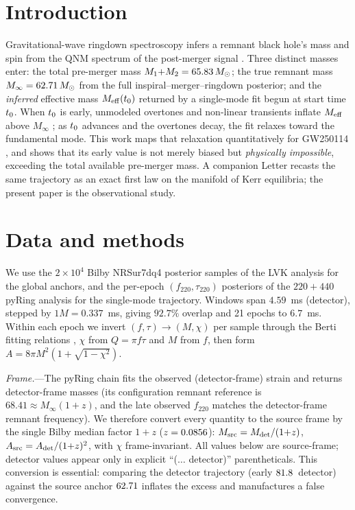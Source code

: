 \documentclass[aps,prd,twocolumn,superscriptaddress,nofootinbib,longbibliography]{revtex4-2}
\newcommand{\Meff}{M_{\rm eff}}\newcommand{\aeff}{\chi_{\rm eff}}
\begin{document}
\section{Introduction}
Gravitational-wave ringdown spectroscopy infers a remnant black hole's mass and
spin from the QNM spectrum of the post-merger signal
\cite{Berti2006,Giesler2019,Isi2019}. Three distinct masses enter: the total
pre-merger mass $M_1{+}M_2=65.83\,M_\odot$; the true remnant mass
$M_\infty=62.71\,M_\odot$ from the full inspiral--merger--ringdown posterior; and
the \emph{inferred} effective mass $\Meff(\tstart)$ returned by a single-mode
fit begun at start time $t_0$. When $t_0$ is early, unmodeled overtones
and non-linear transients inflate $\Meff$ above $M_\infty$
\cite{Giesler2019,Isi2019,Bhagwat2018}; as $t_0$ advances and the overtones
decay, the fit relaxes toward the fundamental mode. This work maps that
relaxation quantitatively for GW250114 \cite{LVK_GW250114}, and shows that its
early value is not merely biased but \emph{physically impossible}, exceeding the
total available pre-merger mass. A companion Letter \cite{Companion2026} recasts
the same trajectory as an exact first law on the manifold of Kerr equilibria; the
present paper is the observational study.

\section{Data and methods}
We use the $2\times10^4$ Bilby NRSur7dq4 posterior samples of the LVK analysis
\cite{Ashton2019,Varma2019} for the global anchors, and the per-epoch
$(f_{220},\tau_{220})$ posteriors of the $220{+}440$ pyRing analysis
\cite{Carullo2019,Cornish2015} for the single-mode trajectory. Windows span
$4.59$~ms (detector), stepped by $1M=0.337$~ms, giving $92.7\%$ overlap and 21
epochs to $6.7$~ms. Within each epoch we invert $(f,\tau)\to(M,\chi)$ per sample
through the Berti fitting relations \cite{Berti2006},
$\chi$ from $Q=\pi f\tau$ and $M$ from $f$, then form $A=8\pi M^2(1+\sqrt{1-
\chi^2})$.

\emph{Frame.}---The pyRing chain fits the observed (detector-frame) strain and
returns detector-frame masses (its configuration remnant reference is
$68.41\approx M_\infty(1{+}z)$, and the late observed $f_{220}$ matches the
detector-frame remnant frequency). We therefore convert every quantity to the
source frame by the single Bilby median factor $1{+}z$ ($z=0.0856$):
$M_{\rm src}=M_{\rm det}/(1{+}z)$, $A_{\rm src}=A_{\rm det}/(1{+}z)^2$, with
$\chi$ frame-invariant. All values below are source-frame; detector values
appear only in explicit ``($\ldots$ detector)'' parentheticals. This conversion
is essential: comparing the detector trajectory (early $81.8$~detector)
against the source anchor $62.71$ inflates the excess and manufactures a false
convergence.
\end{document}
